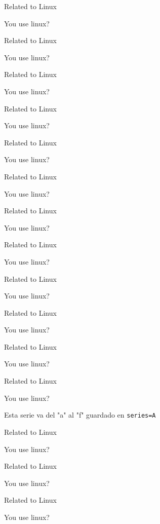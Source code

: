 \documentclass{article}
\begin{document}
\begin{enumext}[resume=A]
  \item Related to Linux
  \item You use linux? %
  \item Related to Linux
  \item You use linux? %
  \item Related to Linux
  \item You use linux? %
\end{enumext}
\begin{enumext}[resume=A]
  \item Related to Linux
  \item You use linux? %
  \item Related to Linux
  \item You use linux? %
  \item Related to Linux
  \item You use linux? %
\end{enumext}
\begin{enumext}[resume=A]
  \item Related to Linux
  \item You use linux? %
  \item Related to Linux
  \item You use linux? %
  \item Related to Linux
  \item You use linux? %
\end{enumext}


\begin{enumext}[resume]
  \item Related to Linux
  \item You use linux? %
  \item Related to Linux
  \item You use linux? %
  \item Related to Linux
  \item You use linux? %
\end{enumext}


\stop


Esta serie va del "a" al "f" guardado en \verb+series=A+

\begin{enumext}[label=\alph*, series=A]
  \item Related to Linux
  \item You use linux? %
  \item Related to Linux
  \item You use linux? %
  \item Related to Linux
  \item You use linux? %
\end{enumext}
\end{document}
